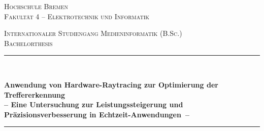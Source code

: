 \documentclass[11pt]{scrartcl}
\newcommand{\MetaInstitute}{Hochschule Bremen}
\newcommand{\MetaUnit}{Fakultät 4 -- Elektrotechnik und Informatik}
\newcommand{\MetaTitle}{Anwendung von Hardware-Raytracing zur Optimierung der Treffererkennung}
\newcommand{\MetaSubtitle}{Eine Untersuchung zur Leistungssteigerung und Präzisionsverbesserung in Echtzeit-Anwendungen}
\newcommand{\MetaTask}{Bachelorthesis}
\newcommand{\MetaStudyProgram}{Internationaler Studiengang Medieninformatik (B.Sc.)}
\newcommand{\HRule}{\rule{\linewidth}{0.2mm}}	%
\begin{document}
	
	\begin{titlepage}
		\shortdate %
		\center %
		
		
		
		\begin{figure}[h!]
			\centering
		\end{figure}
		
		\vspace{-0.5cm}
		\textsc{\Large \MetaInstitute}\\[0.2cm] %
		\textsc{\Large \MetaUnit}%
		
		\textsc{\large \MetaStudyProgram}\\[1.5cm]
		
		\textsc{\LARGE \MetaTask}\\[1.5cm] %
		
		\HRule \\[0.5cm]
		{
			\LARGE \bfseries \MetaTitle \\[0.50cm] %
			\LARGE \bfseries -- \MetaSubtitle\ -- \\[0.50cm] %
			\par
		}
		\HRule \\[1.5cm]
		

\end{titlepage}
\end{document}
